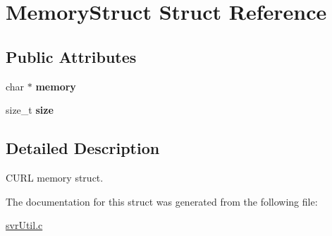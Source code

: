 \hypertarget{structMemoryStruct}{
\section{MemoryStruct Struct Reference}
\label{structMemoryStruct}
}
\subsection*{Public Attributes}
\begin{CompactItemize}
\item 
\hypertarget{structMemoryStruct_218a6fde0f367d44400542cbe523e943}{
char $\ast$ \textbf{memory}}
\label{structMemoryStruct_218a6fde0f367d44400542cbe523e943}

\item 
\hypertarget{structMemoryStruct_79d6a7ad34b172f766c19d0846688440}{
size\_\-t \textbf{size}}
\label{structMemoryStruct_79d6a7ad34b172f766c19d0846688440}

\end{CompactItemize}


\subsection{Detailed Description}
CURL memory struct. 

The documentation for this struct was generated from the following file:\begin{CompactItemize}
\item 
\hyperlink{svrUtil_8c}{svrUtil.c}\end{CompactItemize}
